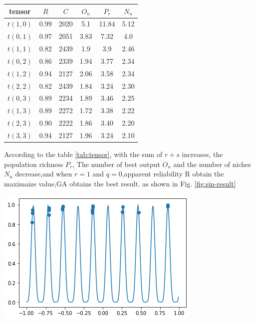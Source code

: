 \documentclass[smallextended]{svjour3}       %
\begin{document}
\begin{multicols}{2}
\begin{center}
\begin{tabular}{cccccc}
	\toprule
    tensor & $R$ & $C$ & $O_{n}$ & $P_{r}$ & $N_{n}$\\
	\midrule
    $t(1,0)$ & 0.99 & 2020 & 5.1 & 11.84 & 5.12 \\
    $t(0,1)$ & 0.97 & 2051 & 3.83 & 7.32 & 4.0 \\
    $t(1,1)$ & 0.82 & 2439 & 1.9 & 3.9 & 2.46 \\
    $t(0,2)$ & 0.86 & 2339 & 1.94 & 3.77 & 2.34 \\
    $t(1,2)$ & 0.94 & 2127 & 2.06 & 3.58 & 2.34 \\
    $t(2,2)$ & 0.82 & 2439 & 1.84 & 3.24 & 2.30 \\
    $t(0,3)$ & 0.89 & 2234 & 1.89 & 3.46 & 2.25 \\
    $t(1,3)$ & 0.89 & 2272 & 1.72 & 3.38 & 2.22 \\
    $t(2,3)$ & 0.90 & 2222 & 1.86 & 3.40 & 2.20 \\
    $t(3,3)$ & 0.94 & 2127 & 1.96 & 3.24 & 2.10 \\
	\bottomrule
\end{tabular}
\label{tab:tensor}
\end{center}

According to the table \ref{tab:tensor}, with the sum of $r+s$ increases, the population richness $P_r$,
The number of best output $O_n$ and the number of niches $N_n$ decrease,and 
when $r=1$ and $q=0$,apparent reliability R obtain the maximaize value,GA obtains the best result. 
as shown in Fig. \ref{fig:sin-result} 

\begin{center}
  \includegraphics[width=\linewidth]{GA_images/example-sin-result.png}
  \label{fig:sin-result}
\end{center}


\end{multicols}
\end{document}
